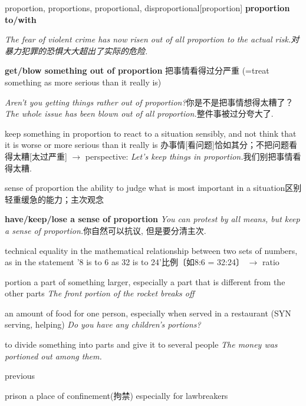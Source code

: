 \begin{DefWord}{proportion, proportions, proportional, disproportional}[proportion]
\textbf{proportion to/with}

\textit{The fear of violent crime has now risen out of all proportion to the actual risk.对暴力犯罪的恐惧大大超出了实际的危险. }

\textbf{get/blow something out of proportion} 把事情看得过分严重
(=treat something as more serious than it really is)

\textit{Aren't you getting things rather out of proportion?}你是不是把事情想得太糟了？
\textit{The whole issue has been blown out of all proportion.}整件事被过分夸大了. 

keep something in proportion to react to a situation sensibly, and not think that it is worse or more serious than it really is 办事情[看问题]恰如其分；不把问题看得太糟[太过严重] $\rightarrow$ perspective:
\textit{Let's keep things in proportion.}我们别把事情看得太糟. 

sense of proportion the ability to judge what is most important in a situation区别轻重缓急的能力；主次观念

\textbf{have/keep/lose a sense of proportion}
\textit{You can protest by all means, but keep a sense of proportion.}你自然可以抗议, 但是要分清主次. 

technical equality in the mathematical relationship between two sets of numbers, as in the statement '8 is to 6 as 32 is to 24'比例〔如8:6 = 32:24〕 $\rightarrow$ ratio


\end{DefWord}



\begin{DefWord}{portion}
    a part of something larger, especially a part that is different from the other parts
    \textit{The front portion of the rocket breaks off}

    an amount of food for one person, especially when served in a restaurant (SYN  serving, helping)
    \textit{Do you have any children's portions?}

    to divide something into parts and give it to several people
    \textit{The money was portioned out among them.}
\end{DefWord}

\begin{DefWord}{previous}
\end{DefWord}

\begin{DefWord}{prison}
    a place of confinement(拘禁) especially for lawbreakers
\end{DefWord}

